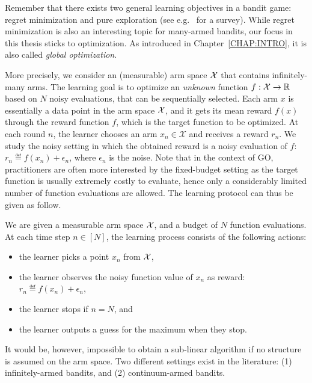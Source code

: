 Remember that there exists two general learning objectives in a bandit game: regret minimization and pure exploration (see e.g.~\citealt{kaufmann2017survey} for a survey). While regret minimization is also an interesting topic for many-armed bandits, our focus in this thesis sticks to optimization. As introduced in Chapter~\ref{CHAP:INTRO}, it is also called \emph{global optimization}.

More precisely, we consider an (measurable) arm space $\mathcal{X}$ that contains infinitely-many arms. The learning goal is to optimize an \emph{unknown} function $f: \mathcal{X} \rightarrow \mathbb{R}$ based on $N$ noisy evaluations, that can be sequentially selected. Each arm $x$ is essentially a data point in the arm space $\mathcal{X}$, and it gets its mean reward $f(x)$ through the reward function $f$, which is the target function to be optimized. At each round $n$, the learner chooses an arm $x_n \in \mathcal{X}$ and receives a reward $r_n$. We study the noisy setting in which the obtained reward is a noisy evaluation of $f$: $r_n \eqdef f(x_n) + \epsilon_n$, where $\epsilon_n$ is the noise. Note that in the context of GO, practitioners are often more interested by the fixed-budget setting as the target function is usually extremely costly to evaluate, hence only a considerably limited number of function evaluations are allowed. The learning protocol can thus be given as follow.

\begin{definition}\label{def:mab.go}
\begin{leftbar}[defnbar]
	We are given a measurable arm space $\mathcal{X}$, and a budget of $N$ function evaluations. At each time step $n\in[N]$, the learning process consists of the following actions:
\begin{itemize}
	\item the learner picks a point $x_n$ from $\mathcal{X}$,
	\item the learner observes the noisy function value of $x_n$ as reward: $r_n \eqdef f(x_n) + \epsilon_n$,
	\item the learner stops if $n=N$, and
	\item the learner outputs a guess for the maximum when they stop.
\end{itemize}
\end{leftbar}
\end{definition}

It would be, however, impossible to obtain a sub-linear algorithm if no structure is assumed on the arm space. Two different settings exist in the literature: (1) \gls{infinitely-armed bandits}, and (2) \gls{continuum-armed bandits}. 

